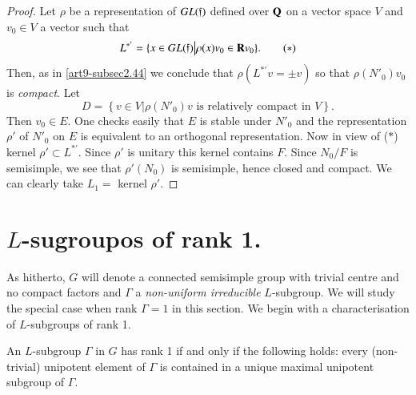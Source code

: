 \begin{proof}
Let $\rho$ be a representation of $GL(\mathfrak{f})$ defined over $\mathbf{Q}$ on a vector space $V$ and $v_0 \in V$ a vector such that 
\begin{equation*}
L^{\ast'} = \{x \in GL (\mathfrak{f})  \big| \rho (x) v_0 \in \mathbf{R} v_0\}. \tag*{($\ast$)}
\end{equation*}
Then, as in \ref{art9-subsec2.44} we conclude that $\rho (L^{\ast'} v = \pm v)$ so that $\rho (N'_0)v_0$  is \textit{compact}. Let
$$
D = \left\{ v \in V \big| \rho (N'_0) v \text{ is relatively compact in } V\right\}.
$$
Then $v_0 \in E$. One checks easily that $E$ is stable under $N'_0$ and the representation $\rho'$ of $N'_0$ on $E$ is equivalent to an orthogonal representation. Now in view of ($\ast$) kernel $\rho' \subset L^{\ast'}$. Since $\rho'$ is unitary this kernel contains $F$. Since $N_0/F$ is semisimple, we see that $\rho' (N_0)$ is semisimple, hence closed and compact. We can clearly take $L_1 =$ kernel $\rho'$.
\end{proof}

\section{$L$-sugroupos of rank 1.}\label{art9-sec3}
As hitherto, $G$ will denote a connected semisimple group with trivial centre and no compact factors and $\Gamma$ a \textit{non-uniform irreducible}  $L$-subgroup. We will study the special case when rank $\Gamma = 1$ in this section. We begin with a characterisation of $L$-subgroups of rank 1.

\begin{theorem}\label{art9-thm3.1}
An $L$-subgroup $\Gamma$ in $G$ has rank 1 if and only if the following holds: every (non-trivial) unipotent element of $\Gamma$ is contained in a unique maximal unipotent subgroup of $\Gamma$.
\end{theorem}

\setcounter{subsection}{1}
